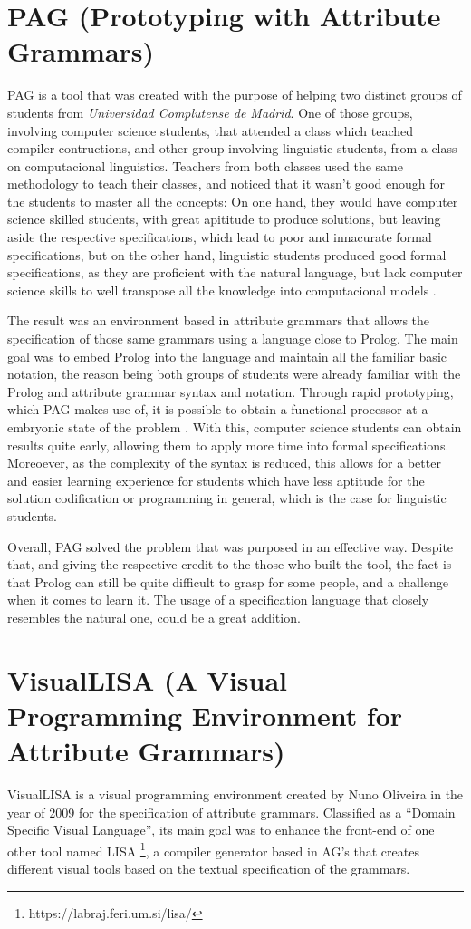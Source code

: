 \section{PAG (Prototyping with Attribute Grammars)}
PAG is a tool that was created with the purpose of helping two distinct groups of students from \emph{Universidad Complutense de Madrid}. One of those groups, involving computer science students, that attended a class which teached compiler contructions, and other group involving linguistic students, from a class on computacional linguistics. Teachers from both classes used the same methodology to teach their classes, and noticed that it wasn't good enough for the students to master all the concepts: On one hand, they would have computer science skilled students, with great apititude to produce solutions, but leaving aside the respective specifications, which lead to poor and innacurate formal specifications, but on the other hand, linguistic students produced good formal specifications, as they are proficient with the natural language, but lack computer science skills to well transpose all the knowledge into computacional models \cite{sierra_2006}.
	
The result was an environment based in attribute grammars that allows the specification of those same grammars using a language close to Prolog. The main goal was to embed Prolog into the language and maintain all the familiar basic notation, the reason being both groups of students were already familiar with the Prolog and attribute grammar syntax and notation. Through rapid prototyping, which PAG makes use of, it is possible to obtain a functional processor at a embryonic state of the problem \cite{sierra_2006}. With this, computer science students can obtain results quite early, allowing them to apply more time into formal specifications. Moreoever, as the complexity of the syntax is reduced, this allows for a better and easier learning experience for students which have less aptitude for the solution codification or programming in general, which is the case for linguistic students.
	
Overall, PAG solved the problem that was purposed in an effective way. Despite that, and giving the respective credit to the those who built the tool, the fact is that Prolog can still be quite difficult to grasp for some people, and a challenge when it comes to learn it. The usage of a specification language that closely resembles the natural one, could be a great addition.
	
\section{VisualLISA (A Visual Programming Environment for Attribute Grammars)}
VisualLISA is a visual programming environment created by Nuno Oliveira in the year of 2009 \cite{oliveira_2009} for the specification of attribute grammars. Classified as a ``Domain Specific  Visual Language'', its main goal was to enhance the front-end of one other tool named LISA \footnote{https://labraj.feri.um.si/lisa/}, a compiler generator based in AG's that creates different visual tools based on the textual specification of the grammars.
    
